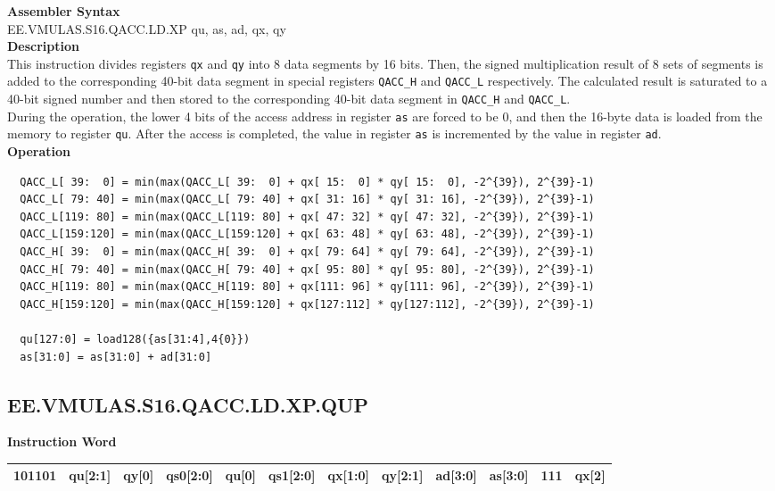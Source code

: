 \textbf{Assembler Syntax} \\
EE.VMULAS.S16.QACC.LD.XP qu, as, ad, qx, qy \\
\textbf{Description} \\
This instruction divides registers \lstinline{qx} and \lstinline{qy} into 8 data segments by 16 bits. Then, the signed multiplication result of 8 sets of segments is added to the corresponding 40-bit data segment in special registers \lstinline{QACC_H} and \lstinline{QACC_L} respectively. The calculated result is saturated to a 40-bit signed number and then stored to the corresponding 40-bit data segment in \lstinline{QACC_H} and \lstinline{QACC_L}.\\
During the operation, the lower 4 bits of the access address in register \lstinline{as} are forced to be 0, and then the 16-byte data is loaded from the memory to register \lstinline{qu}. After the access is completed, the value in register \lstinline{as} is incremented by the value in register \lstinline{ad}.\\
\textbf{Operation}
\begin{lstlisting}
  QACC_L[ 39:  0] = min(max(QACC_L[ 39:  0] + qx[ 15:  0] * qy[ 15:  0], -2^{39}), 2^{39}-1)
  QACC_L[ 79: 40] = min(max(QACC_L[ 79: 40] + qx[ 31: 16] * qy[ 31: 16], -2^{39}), 2^{39}-1)
  QACC_L[119: 80] = min(max(QACC_L[119: 80] + qx[ 47: 32] * qy[ 47: 32], -2^{39}), 2^{39}-1)
  QACC_L[159:120] = min(max(QACC_L[159:120] + qx[ 63: 48] * qy[ 63: 48], -2^{39}), 2^{39}-1)
  QACC_H[ 39:  0] = min(max(QACC_H[ 39:  0] + qx[ 79: 64] * qy[ 79: 64], -2^{39}), 2^{39}-1)
  QACC_H[ 79: 40] = min(max(QACC_H[ 79: 40] + qx[ 95: 80] * qy[ 95: 80], -2^{39}), 2^{39}-1)
  QACC_H[119: 80] = min(max(QACC_H[119: 80] + qx[111: 96] * qy[111: 96], -2^{39}), 2^{39}-1)
  QACC_H[159:120] = min(max(QACC_H[159:120] + qx[127:112] * qy[127:112], -2^{39}), 2^{39}-1)

  qu[127:0] = load128({as[31:4],4{0}})
  as[31:0] = as[31:0] + ad[31:0]
\end{lstlisting}

\clearpage
\subsection{EE.VMULAS.S16.QACC.LD.XP.QUP}\label{instruction:EEVMULASS16QACCLDXPQUP}
\setlength\tabcolsep{6pt}
\textbf{Instruction Word} \\
\begin{tabular}{|c|c|c|c|c|c|c|c|c|c|c|c|}
	\hline
	101101 & qu[2:1] & qy[0] & qs0[2:0] & qu[0] & qs1[2:0] & qx[1:0] & qy[2:1] & ad[3:0] & as[3:0] & 111 & qx[2] \\
	\hline
\end{tabular}

